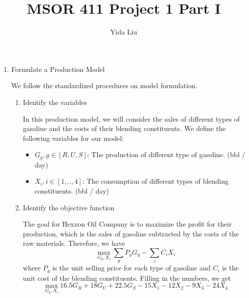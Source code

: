 \documentclass[11pt]{article}
\begin{document}
\author{Yida Liu}
\title{MSOR 411 Project 1 Part I}
\maketitle

\medskip

\begin{enumerate}

\item Formulate a Production Model \par

We follow the standardized procedures on model formulation.

\begin{enumerate}
    \item Identify the variables \par
    In this production model, we will consider the sales of different types of gasoline and the costs of their blending constituents. We define the following variables for our model:
    \begin{itemize}
        \item $G_g, g \in [R, U, S]$: The production of different type of gasoline. (bbl / day)
        \item $X_i, i\in [1,..,4]$: The consumption of different types of blending constituents. (bbl / day)
    \end{itemize}
    
    \item Identify the objective function \par
    The goal for Hexxon Oil Company is to maximize the profit for their production, which is the sales of gasoline subtracted by the costs of the raw materials. Therefore, we have
    $$\max_{G_g, X_i} \sum_{g} P_g G_g - \sum_{i} C_i X_i$$
    where $P_g$ is the unit selling price for each type of gasoline and $C_i$ is the unit cost of the blending constituents. Filling in the numbers, we get
    $$\max_{G_g, X_i} 16.5 G_R + 18 G_U + 22.5 G_S - 15X_1 - 12 X_2 - 9 X_3 - 24X_4$$
    

\end{enumerate}
\end{enumerate}
\end{document}
